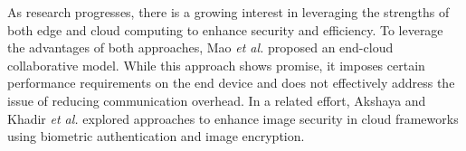 \documentclass[conference]{IEEEtran}
\begin{document}
As research progresses, there is a growing interest in leveraging the strengths of both edge and cloud computing to enhance security and efficiency. To leverage the advantages of both approaches, Mao \textit{et al.} \cite{mao2017survey} proposed an end-cloud collaborative model. While this approach shows promise, it imposes certain performance requirements on the end device and does not effectively address the issue of reducing communication overhead. In a related effort, Akshaya and Khadir \textit{et al.} \cite{kakkad2019biometric} explored approaches to enhance image security in cloud frameworks using biometric authentication and image encryption.

\end{document}
